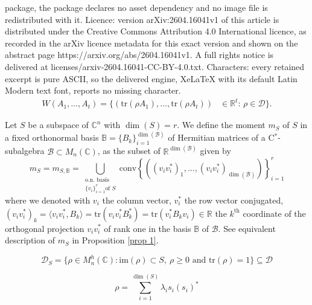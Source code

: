 \documentclass[10pt,a4paper]{amsart}
\def\C{\mathbb C}
\def\R{\mathbb R}
\def\calB{\mathcal B}
\def\calD{\mathcal D}
\def\im{\text{im}}
\def\tr{\text{tr}}
\begin{document}
package, the package declares no asset dependency and no image file is redistributed with it. Licence: version arXiv:2604.16041v1 of this article is distributed under the Creative Commons Attribution 4.0 International licence, as recorded in the arXiv licence metadata for this exact version and shown on the abstract page https://arxiv.org/abs/2604.16041v1. A full rights notice is delivered at licenses/arxiv-2604.16041-CC-BY-4.0.txt. Characters: every retained excerpt is pure ASCII, so the delivered engine, XeLaTeX with its default Latin Modern text font, reports no missing character.
\begin{equation} \label{def jnr}
	\begin{split}
		W(A_1, \dots, A_t) = \{  (\tr(\rho A_1),   \dots, \tr(\rho A_t))& \in \R^t:	\, \rho \in \calD \}.
	\end{split}
\end{equation}

\begin{definition}\label{defi mS}
 	Let $S$ be a subspace of $\C^n$ with $\dim(S)=r$. We define the moment $m_S$ of $S$ in a fixed orthonormal basis $\mathbb{B}=\{B_k\}_{i=1}^{\dim(\calB)}$ of Hermitian matrices of a C$^*$-subalgebra $\calB\subset M_n(\C)$, as the subset of $\R^{\dim(\calB)}$ given by
 	\begin{equation}
 		\label{def momento de un Subesp en relacion a B}
 		m_S=m_{S,\mathbb{B}}=\mathop{\bigcup}\limits_{\substack{\text{o.n. basis } \\
 				\{v_i\}_{i=1}^{r} \text{of } S}
 		}  \text{conv}\left\{ \left(\left(v_i v_i^*\right)_1,\dots, \left(v_i v_i^*\right)_{\dim(\calB)} \right)  \right\}_{i=1}^{r}
 	\end{equation}
 	where we denoted with $v_i$ the column vector, $v_i^*$ the row vector conjugated, $\left(v_i v_i^*\right)_k=\langle v_i v_i^*, B_k\rangle=\tr(v_i v_i^* B_k^*)=\tr( v_i^* B_k v_i)\in\R$ the $k^\text{th}$ coordinate of the orthogonal projection  $v_i v_i^*$ of  rank one in the basis $\mathbb{B}$ of $\calB$. See equivalent description of $m_S$ in Proposition \ref{prop 1}. 
 	
  	
\end{definition}

\begin{equation}
	\label{def matrices de densidad de S}
	\calD_{S}=\{\rho\in M^h_n(\C): \im(\rho)\subset S,\ \rho\geq 0 \text{ and } \tr(\rho)=1\}\subseteq \calD
\end{equation}

\begin{equation}\label{equ densidad escrita usando autovals y autovecs}
\rho=\sum_{i=1}^{\dim(S)} \lambda_i s_i (s_i)^*
\end{equation}
\end{document}
